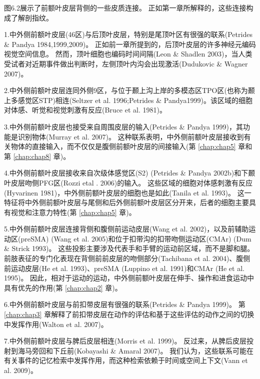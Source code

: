 图6.2展示了前额叶皮层背侧的一些皮质连接。
正如第一章所解释的，这些连接构成了解剖指纹。
\par


1.中外侧前额叶皮层(46区)与后顶叶皮层，特别是尾顶叶区有很强的联系(Petrides \& Pandya 1984,1999,2009)。
正如前一章所提到的，后顶叶皮层的许多神经元编码视觉空间信息。
然而，顶叶细胞也编码时间间隔(Leon \& Shadlen 2003)，当人类受试者对近期事件做出判断时，左侧顶叶内沟会出现激活(Dudukovic \& Wagner 2007)。
\par


2.中外侧前额叶皮层连同外侧9区，与位于颞上沟上岸的多模态区TPO区(也称为颞上多感觉区STP)相连(Seltzer et al. 1996;Petrides \& Pandya1999)。该区域的细胞对体感、听觉和视觉刺激有反应(Bruce et al. 1981)。
\par


3.中外侧前额叶皮层也接受来自周围皮层的输入(Petrides \& Pandya 1999)，其功能是识别物体(Murray et al. 2007)。
这种联系表明，中外侧前额叶皮层接收到有关物体的直接输入，而不仅仅是腹侧前额叶皮层的间接输入(第 \ref{chap:chap5} 章和第 \ref{chap:chap8} 章)。
\par


4.中外侧前额叶皮层接收来自次级体感觉区(S2) (Petrides \& Pandya 2002b)和下颞叶皮层吻侧PFG区(Rozzi etal . 2006)的输入。
这些区域的细胞对体感刺激有反应(Hyvarinen 1981)，中外侧前额叶皮层的细胞也是如此(Tanila et al. 1993)。
这一特征将中外侧前额叶皮层与尾侧和后外侧前额叶皮层区分开来，后者的细胞主要具有视觉和注意力特性(第 \ref{chap:chap5} 章)。
\par


5.中外侧前额叶皮层连接背侧和腹侧前运动皮层(Wang et al. 2002)，以及前辅助运动区(preSMA) (Wang et al. 2005)和位于扣带沟的扣带吻侧运动区(CMAr) (Dum \& Strick 1993)。
这些投影主要涉及代表手和手臂的运动前区域，而不是脚和腿。
前肢表征的专门化表现在背侧前前皮层的吻侧部分(Tachibana et al. 2004)、腹侧前运动皮层(He et al. 1993)、preSMA (Luppino et al. 1991)和CMAr (He et al. 1995)。
因此，相对于运动的运动，中外侧前额叶皮层在伸手、操作和进食运动中具有优先的作用(第 \ref{chap:chap2} 章)。
\par


6.中外侧前额叶皮层与前扣带皮层有很强的联系(Petrides \& Pandya 1999)。
第 \ref{chap:chap3} 章解释了前扣带皮层在动作的评估和基于这些评估的动作之间的切换中发挥作用(Walton et al. 2007)。
\par


7.中外侧前额叶皮层与脾后皮层相连(Morris et al. 1999)。
反过来，从脾后皮层投射到海马旁回和下丘前(Kobayashi \& Amaral 2007)。
我们认为，这些联系可能在有关事件的记忆检索中发挥作用，而这种检索依赖于时间或空间上下文(Vann et al. 2009)。
\par


